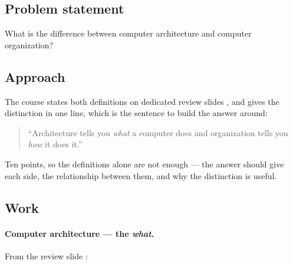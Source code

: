 





\subsection*{Problem statement}

What is the difference between computer architecture and computer organization?

\subsection*{Approach}

The course states both definitions on dedicated review slides
, and gives the distinction in
one line, which is the sentence to build the answer around:

\begin{quote}
``Architecture tells you \emph{what} a computer does and organization tells you
\emph{how} it does it.'' 
\end{quote}

Ten points, so the definitions alone are not enough — the answer should give
each side, the relationship between them, and why the distinction is useful.

\subsection*{Work}

\paragraph{Computer architecture — the \emph{what}.}
From the review slide :

